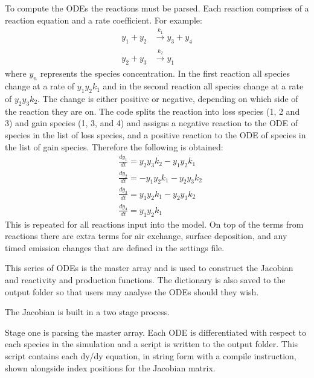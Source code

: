 \documentclass[a4paper]{refart}
\begin{document}
To compute the ODEs the reactions must be parsed. Each reaction comprises of a reaction equation and a rate coefficient. For example:
\begin{equation*}
\begin{split}
    y_1 + y_2 &\xrightarrow[]{k_1} y_3 + y_4\\
    y_2 + y_3 &\xrightarrow[]{k_2} y_1
\end{split}
\end{equation*}
where $y_n$ represents the species concentration. In the first reaction all species change at a rate of $y_1y_2k_1$ and in the second reaction all species change at a rate of $y_2y_3k_2$. The change is either positive or negative, depending on which side of the reaction they are on. The code splits the reaction into loss species (1, 2 and 3) and gain species (1, 3, and 4) and assigns a negative reaction to the ODE of species in the list of loss species, and a positive reaction to the ODE of species in the list of gain species. Therefore the following is obtained:
\begin{equation*}
\begin{split}
    &\frac{dy_1}{dt} = y_2y_3k_2 - y_1y_2k_1\\
    &\frac{dy_2}{dt} = - y_1y_2k_1 - y_2y_3k_2\\
    &\frac{dy_3}{dt} = y_1y_2k_1 - y_2y_3k_2\\
    &\frac{dy_4}{dt} = y_1y_2k_1
\end{split}
\end{equation*}
This is repeated for all reactions input into the model. On top of the terms from reactions there are extra terms for air exchange, surface deposition, and any timed emission changes that are defined in the settings file.

This series of ODEs is the master array and is used to construct the Jacobian and reactivity and production functions. The dictionary is also saved to the output folder so that users may analyse the ODEs should they wish.

\label{Jacobian}

The Jacobian is built in a two stage process.

Stage one is parsing the master array. Each ODE is differentiated with respect to each species in the simulation and a script is written to the output folder. This script contains each dy/dy equation, in string form with a compile instruction, shown alongside index positions for the Jacobian matrix.
\end{document}
